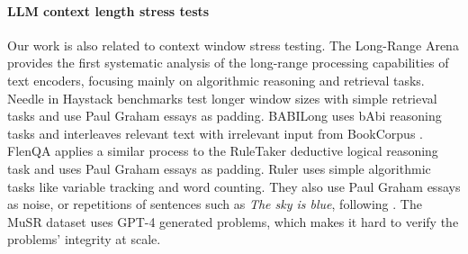 \paragraph{LLM context length stress tests}  Our work is also related to context window stress testing. The Long-Range Arena \cite{tay2021long} provides the first systematic analysis of the long-range processing capabilities of text encoders, focusing mainly on algorithmic reasoning and retrieval tasks. Needle in Haystack benchmarks \cite{kamradt2023needlenih,li2024needlebench} test longer window sizes with simple retrieval tasks and use Paul Graham essays as padding. BABILong   \cite{kuratov2024babilong} uses bAbi \cite{babi} reasoning tasks and interleaves relevant text with irrelevant input from BookCorpus \cite{Zhu_2015_ICCV}. FlenQA \cite{levy2024same} applies a similar process to the RuleTaker \cite{ruletaker} deductive logical reasoning task and uses Paul Graham essays as padding. Ruler uses simple algorithmic tasks like variable tracking and word counting. They also use Paul Graham essays as noise, or repetitions of sentences such as \textit{The sky is blue}, following \citet{mohtashami2024random}. %
The MuSR dataset uses GPT-4 generated \cite{sprague2023musr} problems, which makes it hard to verify the problems' integrity at scale.
